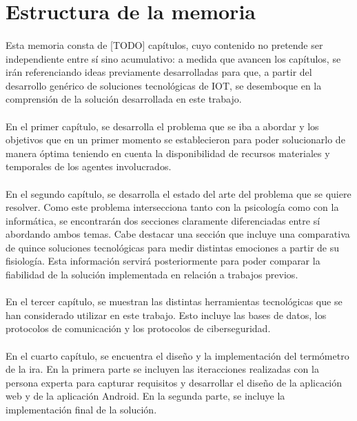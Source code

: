\section{Estructura de la memoria}
\label{sec:estructuraMemoria}
\paragraph{}
Esta memoria consta de [TODO] capítulos, cuyo contenido no pretende ser independiente entre sí sino acumulativo: a medida que avancen los capítulos, se irán referenciando ideas previamente desarrolladas para que, a partir del desarrollo genérico de soluciones tecnológicas de IOT, se desemboque en la comprensión de la solución desarrollada en este trabajo.

\paragraph{}
En el primer capítulo, se desarrolla el problema que se iba a abordar y los objetivos que en un primer momento se establecieron para poder solucionarlo de manera óptima teniendo en cuenta la disponibilidad de recursos materiales y temporales de los agentes involucrados.

\paragraph{}
En el segundo capítulo, se desarrolla el estado del arte del problema que se quiere resolver. Como este problema intersecciona tanto con la psicología como con la informática, se encontrarán dos secciones claramente diferenciadas entre sí abordando ambos temas. Cabe destacar una sección que incluye una comparativa de quince soluciones tecnológicas para medir distintas emociones a partir de su fisiología. Esta información servirá posteriormente para poder comparar la fiabilidad de la solución implementada en relación a trabajos previos.

\paragraph{}
En el tercer capítulo, se muestran las distintas herramientas tecnológicas que se han considerado utilizar en este trabajo. Esto incluye las bases de datos, los protocolos de comunicación y los protocolos de ciberseguridad.

\paragraph{}
En el cuarto capítulo, se encuentra el diseño y la implementación del termómetro de la ira. En la primera parte se incluyen las iteracciones realizadas con la persona experta para capturar requisitos y desarrollar el diseño de la aplicación web y de la aplicación Android. En la segunda parte, se incluye la implementación final de la solución.